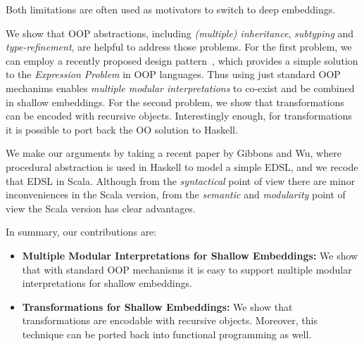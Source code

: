 \noindent Both limitations are often used as motivators to switch to deep embeddings.

We show that OOP abstractions, including \emph{(multiple)
  inheritance}, \emph{subtyping} and \emph{type-refinement}, are
helpful to address those problems. For the first problem, we can
employ a recently proposed design pattern~\cite{}, which provides a simple
solution to the \emph{Expression Problem}\cite{} in OOP languages. Thus
using just standard OOP mechanims enables \emph{multiple modular
  interpretations} to co-exist and be combined in shallow embeddings.
For the second problem, we show that transformations can be encoded 
with recursive objects. Interestingly enough, for transformations it
is possible to port back the OO solution to Haskell. 

We make our arguments by taking a recent paper by Gibbons and Wu,
where procedural abstraction is used in Haskell to model a simple
EDSL, and we recode that EDSL in Scala. Although from the
\emph{syntactical} point of view there are minor inconveniences in
the Scala version, from the \emph{semantic} and \emph{modularity} point of view the
Scala version has clear advantages.

In summary, our contributions are:

\begin{itemize}

\item {\bf Multiple Modular Interpretations for Shallow Embeddings:} 
  We show that with standard OOP mechanisms it is easy to support multiple modular
  interpretations for shallow embeddings.

\item {\bf Transformations for Shallow Embeddings:} We show that
  transformations are encodable with recursive objects. Moreover, this technique
  can be ported back into functional programming as well.

\end{itemize}